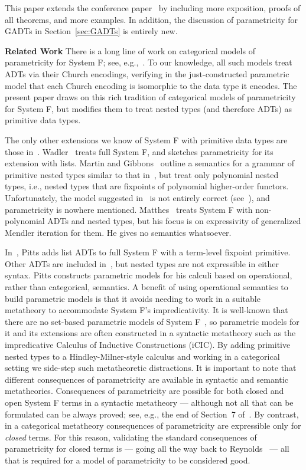\documentclass{lmcs}
\theoremstyle{plain}\newtheorem{satz}[thm]{Satz}
\begin{document}
This paper extends the conference paper~\cite{jgj21} by including more
exposition, proofs of all theorems, and more examples. In addition,
the discussion of parametricity for GADTs in Section~\ref{sec:GADTs}
is entirely new.

\vspace*{0.05in}

\noindent
{\bf Related Work}\/ There is a long line of work on categorical
models of parametricity for System F; see,
e.g.,~\cite{bfss90,bm05,dr04,gjfor15,has94,jac99,mr92,rr94}.  To our
knowledge, all such models treat ADTs via their Church encodings,
verifying in the just-constructed parametric model that each Church
encoding is isomorphic to the data type it encodes.  The present paper
draws on this rich tradition of categorical models of parametricity
for System F, but modifies them to treat nested types (and therefore
ADTs) as primitive data types.

The only other extensions we know of System F with primitive data
types are those in~\cite{mat11,mg01,pit98,pit00,wad89}.
Wadler~\cite{wad89} treats full System F, and sketches parametricity
for its extension with lists. Martin and Gibbons~\cite{mg01} outline a
semantics for a grammar of primitive nested types similar to that
in~\cite{jp19}, but treat only polynomial nested types, i.e., nested
types that are fixpoints of polynomial higher-order
functors. Unfortunately, the model suggested in~\cite{mg01} is not
entirely correct (see~\cite{jp19}), and parametricity is nowhere
mentioned.  Matthes~\cite{mat11} treats System F with non-polynomial
ADTs and nested types, but his focus is on expressivity of generalized
Mendler iteration for them. He gives no semantics whatsoever.

In~\cite{pit00}, Pitts adds list ADTs to full System F with a
term-level fixpoint primitive. Other ADTs are included
in~\cite{pit98}, but nested types are not expressible in either
syntax. Pitts constructs parametric models for his calculi based on
operational, rather than categorical, semantics. A benefit of using
operational semantics to build parametric models is that it avoids
needing to work in a suitable metatheory to accommodate System F's
impredicativity. It is well-known that there are no set-based
parametric models of System F~\cite{rey84}, so parametric models for
it and its extensions are often constructed in a syntactic metatheory
such as the impredicative Calculus of Inductive Constructions (iCIC).
By adding primitive nested types to a Hindley-Milner-style calculus
and working in a categorical setting we side-step such metatheoretic
distractions. It is important to note that different consequences of
parametricity are available in syntactic and semantic
metatheories. Consequences of parametricity are possible for both
closed and open System F terms in a syntactic metatheory --- although
not all that can be formulated can be always proved; see, e.g., the
end of Section~7 of~\cite{bm98}. By contrast, in a categorical
metatheory consequences of parametricity are expressible only for {\em
  closed} terms. For this reason, validating the standard consequences
of parametricity for closed terms is --- going all the way back to
Reynolds~\cite{rey83} --- all that is required for a model of
parametricity to be considered good.
\end{document}
